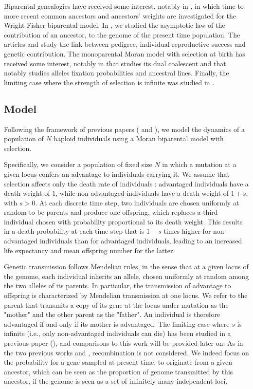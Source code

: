 \documentclass[11pt]{article}
\theoremstyle{remark}
\numberwithin{equation}{section}
\begin{document}
Biparental genealogies have received some interest, notably in \cite{Chang1999,Derrida2000,GravelSteel2015}, in which time to more recent common ancestors and ancestors' weights are investigated for the Wright-Fisher biparental model. In \cite{geneal}, we studied the asymptotic law of the  contribution of an ancestor, to the genome of the present time population. The articles \cite{MatsenEvans2008} and \cite{BartonEtheridge2011} study the link between pedigree, individual reproductive success and genetic contribution. The monoparental Moran model with selection at birth has received some interest, notably in \cite{EtheridgeGriffiths} that studies its dual coalescent and \cite{KluthBaake} that notably studies alleles fixation probabilities and ancestral lines. Finally, the limiting case where the strength of selection is infinite was studied in \cite{CoronLeJan22}.


\subsection{Model}\label{sec:model}

Following the framework of previous papers (\cite{geneal} and \cite{CoronLeJan22}), we model the dynamics of a population of $N$ haploid individuals using a Moran biparental model with selection. 

Specifically, we consider a population of fixed size 
$N$ in which a mutation at a given locus confers an advantage to individuals carrying it. We assume that selection affects only the death rate of individuals : advantaged individuals have a death weight of $1$, while non-advantaged individuals have a death weight of $1+s$, with $s>0$. At each discrete time step, two individuals are chosen uniformly at random to be parents and produce one offspring, which replaces a third individual chosen with probability proportional to its death weight. This results in a death probability at each time step that is $1+s$ times higher for non-advantaged individuals than for advantaged individuals, leading to an increased life expectancy and mean offspring number for the latter.

Genetic transmission follows Mendelian rules, in the sense that at a given locus of the genome, each individual inherits an allele, chosen uniformly at random among the two alleles of its parents. In particular, the transmission of advantage to offspring is characterized by Mendelian transmission at one locus. We refer to the parent that transmits a copy of its gene at the locus under mutation as the "mother" and the other parent as the "father". An individual is therefore advantaged if and only if its mother is advantaged. The limiting case where $s$ is infinite (i.e., only non-advantaged individuals can die) has been studied in a previous paper (\cite{CoronLeJan22}), and comparisons to this work will be provided later on. As in the two previous works \cite{geneal} and \cite{CoronLeJan22}, recombination is not considered. We indeed focus on the probability for a gene sampled at present time, to originate from a given ancestor, which can be seen as the proportion of genome transmitted by this ancestor, if the genome is seen as a set of infinitely many independent loci. 
\end{document}
